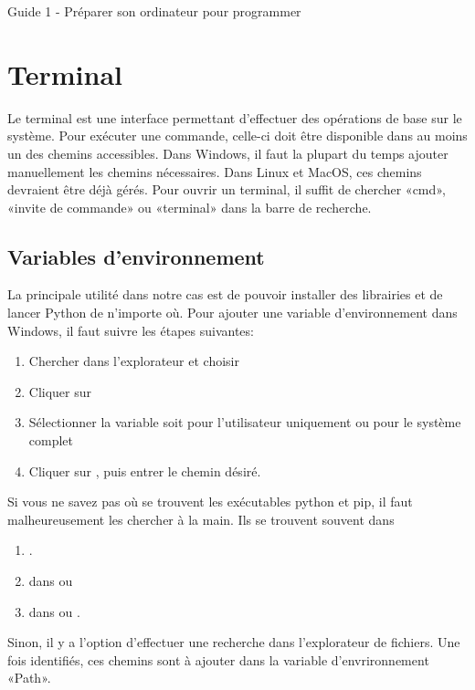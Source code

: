 \documentclass{article}
\begin{document}
\begin{center}
{\Huge Guide 1 - Préparer son ordinateur pour programmer}
\end{center}

\section{Terminal}

Le terminal est une interface permettant d'effectuer des opérations de base sur le système. Pour exécuter une commande, celle-ci doit être disponible  dans au moins un des chemins accessibles. Dans Windows, il faut la plupart du temps ajouter manuellement les chemins nécessaires. Dans Linux et MacOS, ces chemins devraient être déjà gérés. Pour ouvrir un terminal, il suffit de chercher «cmd», «invite de commande» ou «terminal» dans la barre de recherche.


\subsection{Variables d'environnement}

La principale utilité dans notre cas est de pouvoir installer des librairies et de lancer Python de n'importe où. Pour ajouter une variable d'environnement dans Windows, il faut suivre les étapes suivantes:
\begin{enumerate}
\item Chercher dans l'explorateur  et choisir \newline{}
\item Cliquer sur 
\item Sélectionner la variable  soit pour l'utilisateur uniquement ou pour le système complet
\item Cliquer sur , puis entrer le chemin désiré.
\end{enumerate}

Si vous ne savez pas où se trouvent les exécutables python et pip, il faut malheureusement les chercher à la main. Ils se trouvent souvent dans
\begin{enumerate}[label=- ]
\item {}. 
\item {} dans  ou 
\item {} dans  ou .
\end{enumerate}
Sinon, il y a l'option d'effectuer une recherche dans l'explorateur de fichiers. Une fois identifiés, ces chemins sont à ajouter dans la variable d'envrironnement «Path».
\end{document}

